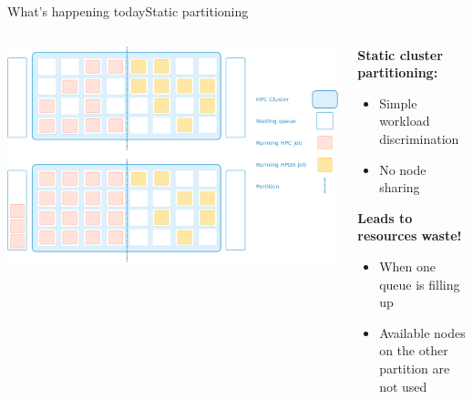 \documentclass[10pt, compress, titleprogressbar, aspectratio=169]{beamer}
\begin{document}
        \begin{frame}{What's happening today}{Static partitioning}
            \begin{columns}
                \begin{column}{0.7\textwidth}
                    \begin{center}
                        \includegraphics[width=\linewidth,height=\textheight,keepaspectratio]{./img/static_partition}
                    \end{center}
                \end{column}
                \begin{column}{0.3\textwidth}
                    \textbf{Static cluster partitioning:}
                    \begin{itemize}
                        \item Simple workload discrimination
                        \item No node sharing
                    \end{itemize}
                    \vspace{2em}

                    \textbf{Leads to resources waste!}
                    \begin{itemize}
                        \item When one queue is filling up
                        \item Available nodes on the other partition are not used
                    \end{itemize}
                \end{column}
            \end{columns}

        \end{frame}
\end{document}
